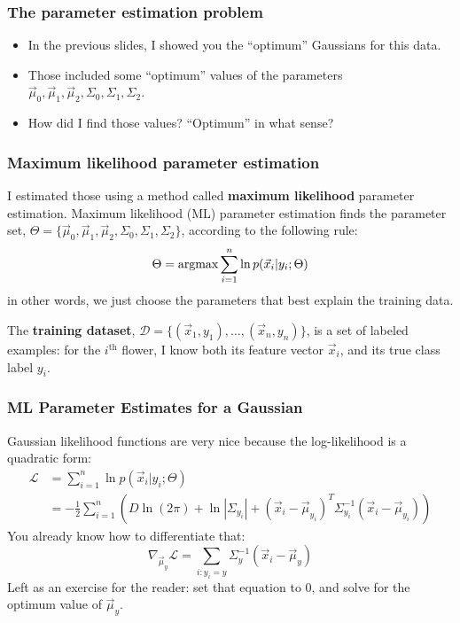 \documentclass{beamer}
\newcommand{\argmax}{\operatornamewithlimits{argmax}}
\begin{document}
\begin{frame}
  \frametitle{The parameter estimation problem}

  \begin{itemize}
  \item
    In the previous slides, I showed you the ``optimum'' Gaussians for
    this data.
  \item 
    Those included some ``optimum'' values of the parameters
    $\vec\mu_0,\vec\mu_1,\vec\mu_2,\Sigma_0,\Sigma_1,\Sigma_2$.
  \item
    How did I find those values?  ``Optimum'' in what  sense?
  \end{itemize}
\end{frame}

\begin{frame}
  \frametitle{Maximum likelihood parameter estimation}

  I estimated those using a method called {\bf maximum likelihood}
  parameter estimation.  Maximum likelihood (ML) parameter estimation
  finds the parameter set,
  $\Theta=\{\vec\mu_0,\vec\mu_1,\vec\mu_2,\Sigma_0,\Sigma_1,\Sigma_2\}$,
  according to the following rule:
  \[
  \Theta = \argmax \sum_{i=1}^n \ln p(\vec{x}_i|y_i;\Theta)
  \]
  in other words, we just choose the parameters that best explain the
  training data.

  The {\bf training dataset}, ${\mathcal
    D}=\{(\vec{x}_1,y_1),\ldots,(\vec{x}_n,y_n)\}$, is a set of
  labeled examples: for the $i^{\textrm{th}}$ flower, I know both its
  feature vector $\vec{x}_i$, and its true class label $y_i$.
\end{frame}

\begin{frame}
  \frametitle{ML Parameter Estimates for a Gaussian}

  Gaussian likelihood functions are very nice because the
  log-likelihood is a quadratic form:
  \begin{align*}
    {\mathcal L} &=\sum_{i=1}^n \ln p(\vec{x}_i|y_i;\Theta)\\
    &=-\frac{1}{2}\sum_{i=1}^n \left(D\ln(2\pi)+\ln|\Sigma_{y_i}|
    + (\vec{x}_i-\vec\mu_{y_i})^T\Sigma_{y_i}^{-1}(\vec{x}_i-\vec\mu_{y_i})\right)
  \end{align*}
  You already know how to differentiate that:
  \begin{displaymath}
    \nabla_{\vec\mu_y}{\mathcal L} =
    \sum_{i:y_i=y}\Sigma_{y}^{-1}(\vec{x}_i-\vec\mu_{y})
  \end{displaymath}
  Left as an exercise for the reader: set that equation to 0, and
  solve for the optimum value of $\vec\mu_y$.
\end{frame}
\end{document}
